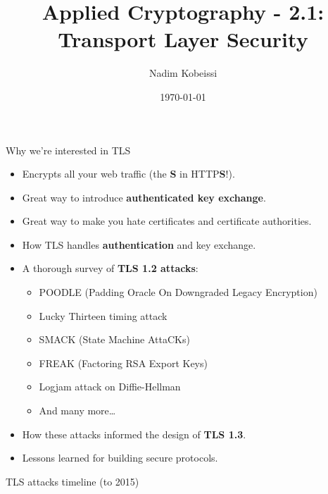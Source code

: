 \ifdefined\PRESENTATION\else\PassOptionsToClass{handout}{beamer}\fi\documentclass[aspectratio=169, lualatex]{beamer}
\title{Applied Cryptography - 2.1: Transport Layer Security}
\author{Nadim Kobeissi}
\institute{Symbolic Software}
\date{\today}
\begin{document}
\begin{frame}[plain]
	\titlepage
\end{frame}

\begin{frame}{Why we're interested in TLS}
	\begin{itemize}[<+->]
		\item Encrypts all your web traffic (the \textbf{S} in HTTP\textbf{S}!).
		\item Great way to introduce \textbf{authenticated key exchange}.
		\item Great way to make you hate certificates and certificate authorities.
		\item How TLS handles \textbf{authentication} and key exchange.
		\item A thorough survey of \textbf{TLS 1.2 attacks}:
		      \begin{itemize}
			      \item POODLE (Padding Oracle On Downgraded Legacy Encryption)
			      \item Lucky Thirteen timing attack
			      \item SMACK (State Machine AttaCKs)
			      \item FREAK (Factoring RSA Export Keys)
			      \item Logjam attack on Diffie-Hellman
			      \item And many more\ldots
		      \end{itemize}
		\item How these attacks informed the design of \textbf{TLS 1.3}.
		\item Lessons learned for building secure protocols.
	\end{itemize}
\end{frame}

\begin{frame}{TLS attacks timeline (to 2015)}
\end{frame}
\end{document}
